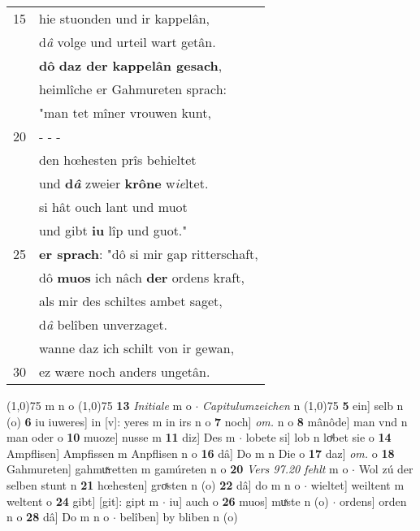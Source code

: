\documentclass[8pt,a4paper,notitlepage]{article}
\begin{document}
\begin{table}[ht]
\begin{minipage}[t]{0.5\linewidth}
\begin{tabular}{rl}
15 & hie stuonden und ir kappelân,\\ 
 & d\textit{â} volge und urteil wart getân.\\ 
 & \textbf{dô} \textbf{daz der kappelân gesach},\\ 
 & heimlîche er Gahmureten sprach:\\ 
 & "man tet mîner vrouwen kunt,\\ 
20 & \multicolumn{1}{l}{ - - - }\\ 
 & den hœhesten prîs behieltet\\ 
 & und \textbf{d\textit{â}} zweier \textbf{krône} w\textit{ie}ltet.\\ 
 & si hât ouch lant und muot\\ 
 & und gibt \textbf{iu} lîp und guot."\\ 
25 & \textbf{er sprach}: "dô si mir gap ritterschaft,\\ 
 & dô \textbf{muos} ich nâch \textbf{der} ordens kraft,\\ 
 & als mir des schiltes ambet saget,\\ 
 & d\textit{â} belîben unverzaget.\\ 
 & wanne daz ich schilt von ir gewan,\\ 
30 & ez wære noch anders ungetân.\\ 
\end{tabular}
\scriptsize
\line(1,0){75} \newline
m n o \newline
\line(1,0){75} \newline
\textbf{13} \textit{Initiale} m o   $\cdot$ \textit{Capitulumzeichen} n  \newline
\line(1,0){75} \newline
\textbf{5} ein] selb n (o) \textbf{6} iu iuweres] in [v]: yeres m in irs n o \textbf{7} noch] \textit{om.} n o \textbf{8} mânôde] man vnd n man oder o \textbf{10} muoze] nusse m \textbf{11} diz] Des m  $\cdot$ lobete si] lob n loͯbet sie o \textbf{14} Ampflisen] Ampfissen m Anpflisen n o \textbf{16} dâ] Do m n Die o \textbf{17} daz] \textit{om.} o \textbf{18} Gahmureten] gahmuͯretten m gamúreten n o \textbf{20} \textit{Vers 97.20 fehlt} m o   $\cdot$ Wol zú der selben stunt n \textbf{21} hœhesten] groͯsten n (o) \textbf{22} dâ] do m n o  $\cdot$ wieltet] weiltent m weltent o \textbf{24} gibt] [git]: gipt m  $\cdot$ iu] auch o \textbf{26} muos] muͯste n (o)  $\cdot$ ordens] orden n o \textbf{28} dâ] Do m n o  $\cdot$ belîben] by bliben n (o) \newline
\end{minipage}
\end{table}
\end{document}
